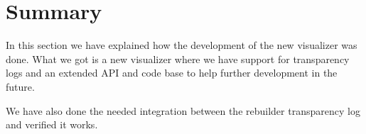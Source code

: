 \documentclass[../Main/thesis.tex]{subfiles}
\begin{document}
\section*{Summary}\label{sec:development-summary}
In this section we have explained how the development of the new visualizer was
done. What we got is a new visualizer where we have support for transparency
logs and an extended API and code base to help further development in the
future.

We have also done the needed integration between the rebuilder transparency log and
verified it works.

\blankpage
\end{document}
